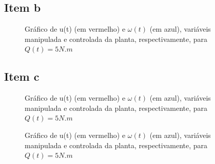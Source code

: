 \documentclass[11pt]{article}
\begin{document}
\subsection{Item b}
\begin{figure}[!htb]
	\caption{Gráfico de u(t) (em vermelho) e $\omega(t)$ (em azul), variáveis manipulada e controlada da planta, respectivamente, para $Q(t) = 5 N.m$}
\end{figure}

\subsection{Item c}

\begin{figure}[!htb]
	\caption{Gráfico de u(t) (em vermelho) e $\omega(t)$ (em azul), variáveis manipulada e controlada da planta, respectivamente, para $Q(t) = 5 N.m$}
\end{figure}

\begin{figure}[!htb]
	\caption{Gráfico de u(t) (em vermelho) e $\omega(t)$ (em azul), variáveis manipulada e controlada da planta, respectivamente, para $Q(t) = 5 N.m$}
\end{figure}
\end{document}

